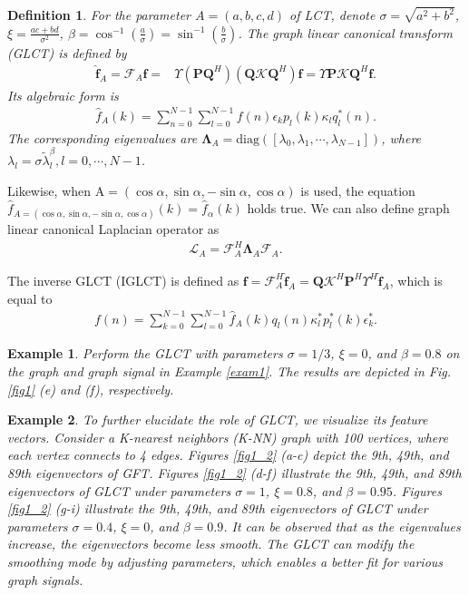 \documentclass[lettersize,journal]{IEEEtran}
\newtheorem{example}{Example}
\newtheorem{defn}{Definition}
\begin{document}
\begin{defn}
	For the parameter $A=(a,b,c,d)$ of LCT, denote $\sigma=\sqrt{a^2+b^2}$, $\xi=\frac{ac+bd}{\sigma^2}$, $\beta=\cos^{-1}\left(\frac{a}{\sigma}\right)=\sin^{-1}\left(\frac{b}{\sigma}\right)$.
	The graph linear canonical transform (GLCT)  is defined by
	\begin{align}
		\hat{\mathbf{f}}_{A} = \mathcal{F}_{A}\mathbf{f} 
		= &\Upsilon (\mathbf{P}\mathbf{Q}^H)(\mathbf{Q} \mathcal{K} \mathbf{Q}^H) \mathbf{f} 
		=  \Upsilon \mathbf{P} \mathcal{K} \mathbf{Q}^H \mathbf{f}.
	\end{align}
	Its algebraic form is
	\begin{align}
		\hat{f}_{A}(k) 
		= \sum_{n=0}^{N-1} \sum_{l=0}^{N-1} f(n)  \epsilon_k p_l(k) \kappa_l q_l^*(n).
	\end{align}
	The corresponding eigenvalues are
	$\boldsymbol{\Lambda}_A
		=\mathrm{diag}\left(\left[{\lambda}_0, {\lambda}_1, \cdots, {\lambda}_{N-1}\right]\right)$,
	where ${\lambda}_l=\sigma \widetilde{\lambda}_l^{\beta}, l=0,\cdots,N-1$.
\end{defn}

Likewise, when $\mathrm{A}=({\cos}\alpha, {\sin}\alpha, -{\sin}\alpha, {\cos}\alpha)$ is used, the equation $\hat{f}_{A=({\cos}\alpha, {\sin}\alpha, -{\sin}\alpha, {\cos}\alpha)}(k)= \hat{f}_{\alpha}(k)$ holds true.
We can also define graph linear canonical Laplacian operator as
\begin{align}
	\mathcal{L}_{A}=\mathcal{F}_{A}^H \boldsymbol{\Lambda}_A \mathcal{F}_{A}.
\end{align}

The inverse GLCT (IGLCT) is defined as $\mathbf{f}=\mathcal{F}^{H}_A \hat{\mathbf{f}}_A= \mathbf{Q} \mathcal{K}^{H} \mathbf{P}^H \Upsilon^{H}\hat{\mathbf{f}}_A$, which is equal to
\begin{align}
	f(n) 
	= \sum_{k=0}^{N-1} \sum_{l=0}^{N-1} \hat{f}_{A}(k) 
	q_l(n) \kappa_l^{*} p_l^*(k) \epsilon_k^{*}.
\end{align}

\begin{example}
	Perform the GLCT with parameters $\sigma=1/3$, $\xi=0$, and $\beta=0.8$ on the graph and graph signal in Example \ref{exam1}. The results are depicted in Fig. \ref{fig1} (e) and (f), respectively.
\end{example}

\begin{example} \label{exam6}
	To further elucidate the role of GLCT, we visualize its feature vectors. Consider a K-nearest neighbors (K-NN) graph with 100 vertices, where each vertex connects to 4 edges. Figures \ref{fig1_2} (a-c) depict the 9th, 49th, and 89th eigenvectors of GFT. Figures \ref{fig1_2} (d-f) illustrate the 9th, 49th, and 89th eigenvectors of GLCT under parameters $\sigma=1$, $\xi=0.8$, and $\beta=0.95$. Figures \ref{fig1_2} (g-i) illustrate the 9th, 49th, and 89th eigenvectors of GLCT under parameters $\sigma=0.4$, $\xi=0$, and $\beta=0.9$.
	It can be observed that as the eigenvalues increase, the eigenvectors become less smooth. The GLCT can modify the smoothing mode by adjusting parameters, which enables a better fit for various graph signals.
\end{example}
\end{document}

